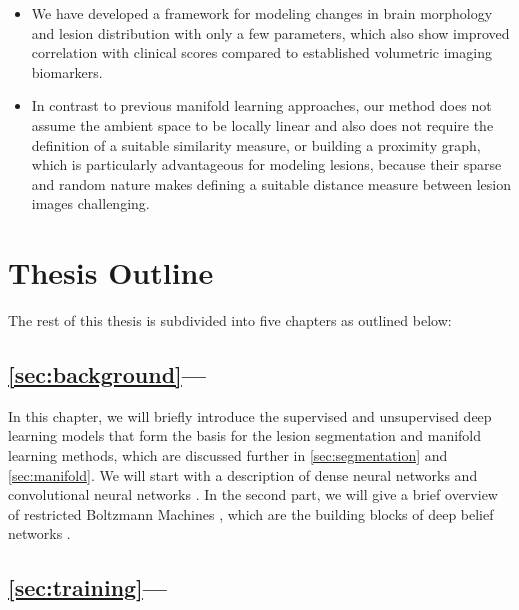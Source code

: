 \begin{itemize}
\item We have developed a framework for modeling changes in brain morphology
and lesion distribution with only a few parameters, which also show improved
correlation with clinical scores compared to established volumetric imaging
biomarkers.

\item In contrast to previous manifold learning approaches, our method does not
assume the ambient space to be locally linear and also does not require the
definition of a suitable similarity measure, or building a proximity graph,
which is particularly advantageous for modeling lesions, because their sparse
and random nature makes defining a suitable distance measure between lesion
images challenging.
\end{itemize}

\section[Thesis outline]{Thesis Outline}

The rest of this thesis is subdivided into five chapters as outlined below:

\subsection*{\ref{sec:background}---}

In this chapter, we will briefly introduce the supervised and unsupervised deep
learning models that form the basis for the lesion segmentation and manifold
learning methods, which are discussed further in \ref{sec:segmentation}
and \ref{sec:manifold}. We will start with a description of dense neural
networks \citep{farley1954,werbos1974,rumelhart1986} and convolutional
neural networks \citep{fukushima1980,lecun1989,lecun1998}. In the second
part, we will give a brief overview of restricted Boltzmann Machines
\citep{freund1992,hinton2010a}, which are the building blocks of deep belief
networks \citep{hinton2006b}.

\subsection*{\ref{sec:training}---}

